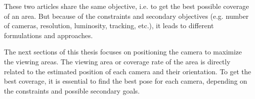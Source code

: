 

These two articles share the same objective, i.e. to get the best possible coverage of an area. But because of the constraints and secondary objectives (e.g. number of cameras, resolution, luminosity, tracking, etc.), it leads to different formulations and approaches. 

The next sections of this thesis focuses on positioning the camera to maximize the viewing areas. The viewing area or coverage rate of the area is directly related to the estimated position of each camera and their orientation. To get the best coverage, it is essential to find the best pose for each camera, depending on the constraints and possible secondary goals.\\

